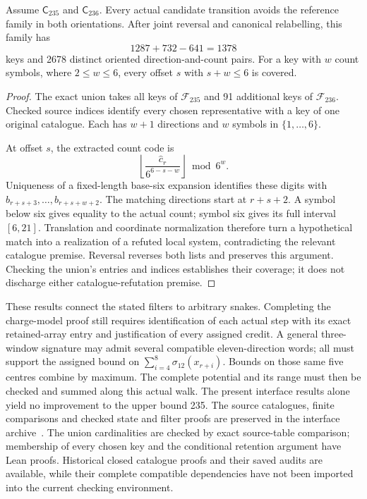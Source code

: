 \begin{proposition}\label{prop:reference-union-retention}
Assume $\mathsf C_{235}$ and $\mathsf C_{236}$. Every actual candidate
transition avoids the reference family in both orientations. After joint
reversal and canonical relabelling, this family has
\[
1287+732-641=1378
\]
keys and 2678 distinct oriented direction-and-count pairs. For a key with
$w$ count symbols, where $2\le w\le6$, every offset $s$ with $s+w\le6$
is covered.
\end{proposition}
\begin{proof}
The exact union takes all keys of $\mathcal F_{235}$ and 91 additional
keys of $\mathcal F_{236}$. Checked source indices identify every chosen
representative with a key of one original catalogue. Each has $w+1$
directions and $w$ symbols in $\{1,\ldots,6\}$.

At offset $s$, the extracted count code is
\[
\left\lfloor\frac{\widehat c_r}{6^{6-s-w}}\right\rfloor\bmod6^w.
\]
Uniqueness of a fixed-length base-six expansion identifies these digits
with $b_{r+s+3},\ldots,b_{r+s+w+2}$. The matching directions start at
$r+s+2$. A symbol below six gives equality to the actual count; symbol
six gives its full interval $[6,21]$. Translation and coordinate
normalization therefore turn a hypothetical match into a realization
of a refuted local system, contradicting the relevant catalogue premise.
Reversal reverses both lists and preserves this argument. Checking the
union's entries and indices establishes their coverage; it does not
discharge either catalogue-refutation premise.
\end{proof}

These results connect the stated filters to arbitrary snakes. Completing
the charge-model proof still requires identification of each actual step
with its exact retained-array entry and justification of every assigned
credit. A general three-window signature may admit several compatible
eleven-direction words; all must support the assigned bound on
$\sum_{i=4}^{8}\sigma_{12}(x_{r+i})$. Bounds on those same five centres
combine by maximum. The complete potential and its range must then be
checked and summed along this actual walk. The present interface results
alone yield no improvement to the upper bound 235. The source catalogues,
finite comparisons and checked state and filter proofs are preserved in the
interface archive~\cite{interfacearchive}. The union cardinalities are checked
by exact source-table comparison; membership of every chosen key and the
conditional retention argument have Lean proofs. Historical closed catalogue
proofs and their saved audits are available, while their complete compatible
dependencies have not been imported into the current checking environment.
